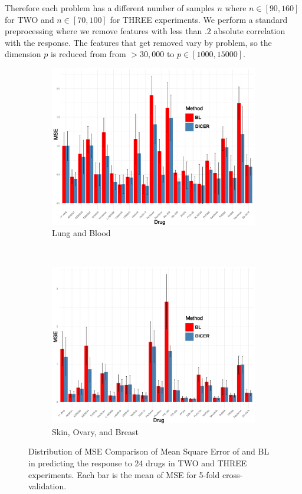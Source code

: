 Therefore each problem has a different number of samples $n$ where $n \in [90, 160]$ for TWO and $n \in [70, 100]$ for THREE experiments.
We perform a standard preprocessing \cite{barretina2012cancer} where we remove features with less than $.2$ absolute correlation with the response.%
The features that get removed vary by problem, so the dimension $p$ is reduced from from $>30,000$ to $p \in [1000, 15000]$. 
	\begin{figure}
	\centering
	\begin{subfigure}[b]{0.22\textwidth}
		\includegraphics[width=\textwidth]{./img/lung-blood-barplot.pdf}
		\caption{Lung and Blood}\label{fig:two}
	\end{subfigure} ~
	\begin{subfigure}[b]{0.22\textwidth}
		\includegraphics[width=\textwidth]{./img/skin-ovary-breast.pdf}
		\caption{Skin, Ovary, and Breast}\label{fig:three}
	\end{subfigure}
	\squeezeup
	\caption{Distribution of MSE Comparison of Mean Square Error of \dc{} and BL in predicting the response to 24 drugs in TWO and THREE experiments. Each bar is the mean of MSE for 5-fold cross-validation.}
	\label{fig syn4}
\end{figure}
